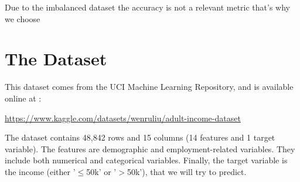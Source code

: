 \vspace{1 \baselineskip}
Due to the imbalanced dataset the accuracy is not a relevant metric that's why we choose

\vspace{2 \baselineskip}
\section{The Dataset}
This dataset comes from the UCI Machine Learning Repository, and is available online at : 

\underline{https://www.kaggle.com/datasets/wenruliu/adult-income-dataset}

\vspace{1 \baselineskip}
The dataset contains 48,842 rows and 15 columns (14 features and 1 target variable). The features are demographic and employment-related variables. They include both numerical and categorical variables. Finally, the target variable is the income (either '$\le$50k' or '$>$50k'), that we will try to predict. 

\vspace{2 \baselineskip}
